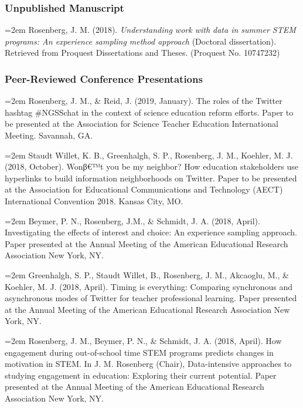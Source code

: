 \documentclass[]{article}
\newcommand{\euro}{€}
\begin{document}
\subsubsection{Unpublished Manuscript}\label{unpublished-manuscript}

\hangindent=2em Rosenberg, J. M. (2018). \emph{Understanding work with
data in summer STEM programs: An experience sampling method approach}
(Doctoral dissertation). Retrieved from Proquest Dissertations and
Theses. (Proquest No. 10747232)

\subsubsection{Peer-Reviewed Conference
Presentations}\label{peer-reviewed-conference-presentations}

\hangindent=2em Rosenberg, J. M., \& Reid, J. (2019, January). The roles
of the Twitter hashtag \#NGSSchat in the context of science education
reform efforts. Paper to be presented at the Association for Science
Teacher Education International Meeting. Savannah, GA.

\hangindent=2em Staudt Willet, K. B., Greenhalgh, S. P., Rosenberg, J.
M., Koehler, M. J. (2018, October). Wonβ\euro{}™t you be my neighbor?
How education stakeholders use hyperlinks to build information
neighborhoods on Twitter. Paper to be presented at the Association for
Educational Communications and Technology (AECT) International
Convention 2018. Kansas City, MO.

\hangindent=2em Beymer, P. N., Rosenberg, J.M., \& Schmidt, J. A. (2018,
April). Investigating the effects of interest and choice: An experience
sampling approach. Paper presented at the Annual Meeting of the American
Educational Research Association New York, NY.

\hangindent=2em Greenhalgh, S. P., Staudt Willet, B., Rosenberg, J. M.,
Akcaoglu, M., \& Koehler, M. J. (2018, April). Timing is everything:
Comparing synchronous and asynchronous modes of Twitter for teacher
professional learning. Paper presented at the Annual Meeting of the
American Educational Research Association New York, NY.

\hangindent=2em Rosenberg, J. M., Beymer, P. N., \& Schmidt, J. A.
(2018, April). How engagement during out-of-school time STEM programs
predicts changes in motivation in STEM. In J. M. Rosenberg (Chair),
Data-intensive approaches to studying engagement in education: Exploring
their current potential. Paper presented at the Annual Meeting of the
American Educational Research Association New York, NY.
\end{document}
